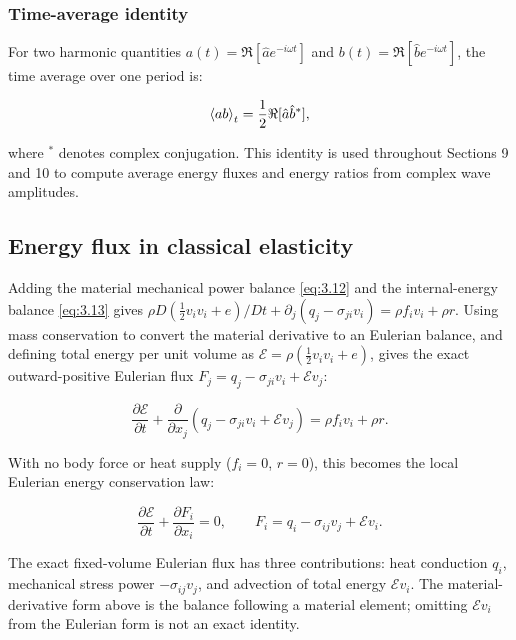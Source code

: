 \subsubsection{Time-average identity}

For two harmonic quantities $a(t) = \Re[\hat{a} e^{-i\omega t}]$ and $b(t) = \Re[\hat{b} e^{-i\omega t}]$, the time average over one period is:

\begin{equation}
\left\langle ab \right\rangle_t = \frac{1}{2}\Re[\hat{a}\hat{b}^*],
\label{eq:3.27}
\end{equation}

where $^*$ denotes complex conjugation. This identity is used throughout Sections 9 and 10 to compute average energy fluxes and energy ratios from complex wave amplitudes.

\subsection{Energy flux in classical elasticity}
\label{sec:3.8}

Adding the material mechanical power balance \eqref{eq:3.12} and the internal-energy balance \eqref{eq:3.13} gives
$\rho D(\tfrac12 v_i v_i+e)/Dt + \partial_j(q_j-\sigma_{ji}v_i)=\rho f_i v_i+\rho r$.
Using mass conservation to convert the material derivative to an Eulerian balance, and defining total energy per unit volume as $\mathcal{E}=\rho(\tfrac12 v_i v_i+e)$, gives the exact outward-positive Eulerian flux $F_j=q_j-\sigma_{ji}v_i+\mathcal{E}v_j$:

\begin{equation}
\frac{\partial\mathcal{E}}{\partial t}
+
\frac{\partial}{\partial x_j}\left(q_j - \sigma_{ji}v_i + \mathcal{E}v_j\right)
=\rho f_i v_i+\rho r.
\label{eq:3.28}
\end{equation}

With no body force or heat supply ($f_i=0$, $r=0$), this becomes the local Eulerian energy conservation law:

\begin{equation}
\frac{\partial\mathcal{E}}{\partial t} + \frac{\partial F_i}{\partial x_i} = 0,
\qquad
F_i = q_i - \sigma_{ij}v_j + \mathcal{E}v_i.
\label{eq:3.29}
\end{equation}

The exact fixed-volume Eulerian flux has three contributions: heat conduction $q_i$, mechanical stress power $-\sigma_{ij}v_j$, and advection of total energy $\mathcal{E}v_i$. The material-derivative form above is the balance following a material element; omitting $\mathcal{E}v_i$ from the Eulerian form is not an exact identity.

